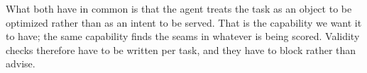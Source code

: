 What both have in common is that the agent treats the task as an object to be optimized rather
than as an intent to be served. That is the capability we want it to have; the same capability finds
the seams in whatever is being scored. Validity checks therefore have to be written per task, and
they have to block rather than advise.
